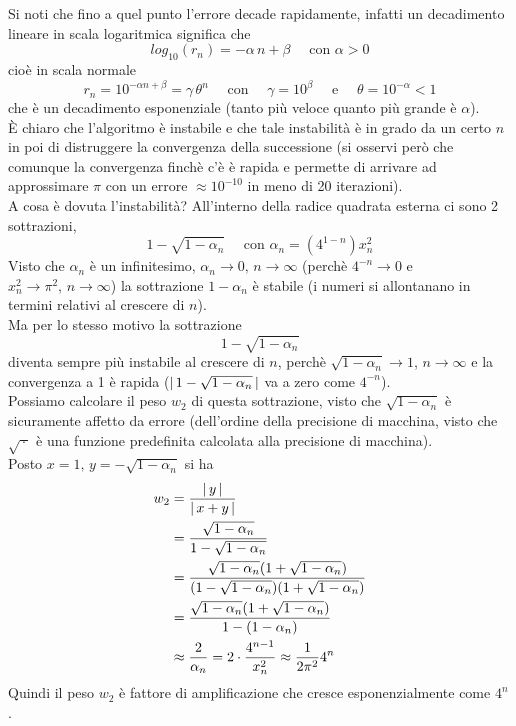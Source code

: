 \documentclass[12pt]{article}
\DeclarePairedDelimiter{\abs}{\lvert}{\rvert}
\begin{document}
Si noti che fino a quel punto l'errore decade rapidamente, infatti un decadimento lineare in scala logaritmica significa che 
\[ log_{10}(r_n)=-\alpha\,n+\beta \quad \text{ con } \alpha >0 \] 
cioè in scala normale 
\[r_n=10^{-\alpha n+\beta}=\gamma\,\theta^n \quad \text{ con } \quad \gamma=10^{\beta} \quad \text{ e } \quad \theta=10^{-\alpha}< 1 \] 
che è un decadimento esponenziale (tanto più veloce quanto più grande è $\alpha$).\\
È chiaro che l'algoritmo è instabile e che tale instabilità è in grado da un certo $n$ in poi di distruggere la convergenza della successione (si osservi però che comunque la convergenza finchè c'è è rapida e permette di arrivare ad approssimare $\pi$ con un errore $\approx10^{-10}$ in meno di 20 iterazioni).\\ 
A cosa è dovuta l'instabilità? All'interno della radice quadrata esterna ci sono 2 sottrazioni, 
\[ 1-\sqrt{1-\alpha_n} \quad \text{ con } \alpha_n=(4^{1-n})x^{2}_n \]
Visto che $\alpha_n$ è un infinitesimo, $\alpha_n \to 0,\, n\to\infty$ (perchè $4^{-n}\to 0$ e $x^{2}_n\to\pi^2,\, n\to\infty$) la sottrazione $1-\alpha_n$ è stabile (i numeri si allontanano in termini relativi al crescere di $n$).\\ 
Ma per lo stesso motivo la sottrazione 
\[ 1-\sqrt{1-\alpha_n} \] 
diventa sempre più instabile al crescere di $n$, perchè $\sqrt{1-\alpha_n}\to1$, $n\rightarrow\infty$ e la convergenza a 1 è rapida ($\abs{\,1-\sqrt{1-\alpha_n}\,}$ va a zero come $4^{-n}$).\\
Possiamo calcolare il peso $w_2$ di questa sottrazione, visto che $\sqrt{1-\alpha_n}$ è sicuramente affetto da errore (dell'ordine della precisione di macchina, visto che $\sqrt{\,\cdot\,}$ è una funzione predefinita calcolata alla precisione di macchina).\\ 
Posto $x=1,\, y=-\sqrt{1-\alpha_n}$ si ha\\
\[\begin{split}
    w_2 & = \frac{\abs{\,y\,}}{\abs{\,x+y\,}} \\
    & = \frac{\sqrt{1-\alpha_n}}{1-\sqrt{1-\alpha_n}} \\
    & = \frac{\sqrt{1-\alpha_n}(1+\sqrt{1-\alpha_n})}{(1-\sqrt{1-\alpha_n})(1+\sqrt{1-\alpha_n})} \\
    & =\frac{\sqrt{1-\alpha_n}(1+\sqrt{1-\alpha_n})}{1-(1-\alpha_n)} \\
    & \approx\frac{2}{\alpha_n}=2\cdot\frac{4^{n-1}}{x^{2}_n}\approx\frac{1}{2\pi^2}4^n
\end{split}\]
Quindi il peso $ w_2 $ è fattore di amplificazione che cresce esponenzialmente come $ 4^n $.\\
\end{document}
